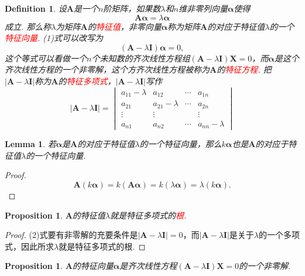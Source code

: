 \documentclass{article}
\newtheorem{lemma}[theorem]{Lemma}
\newtheorem{proposition}[theorem]{Proposition}
\newtheorem{definition}[theorem]{Definition}
\newcommand{\mbf}[1]{\bm{#1}}
\newcommand{\redt}[1]{\textcolor{red}{#1}}
\begin{document}
\begin{definition}
\rm 设$\mbf{A}$是一个$n$阶矩阵，如果数$\lambda$和$n$维非零列向量$\mbf{\alpha}$使得
\begin{equation}
\mbf{A}\mbf{\alpha} = \lambda\mbf{\alpha}
\end{equation}
成立. 那么称$\lambda$为矩阵$\mbf{A}$的\redt{特征值}，非零向量$\mbf{\alpha}$称为矩阵$\mbf{A}$的对应于特征值$\lambda$的一个\redt{特征向量}. (1)式可以改写为
\begin{equation}
(\mbf{A}-\lambda\mbf{I})\mbf{\alpha} = 0,
\end{equation}
这个等式可以看做一个$n$个未知数的齐次线性方程组$(\mbf{A}-\lambda\mbf{I})\mbf{X} = 0$，而$\mbf{\alpha}$是这个齐次线性方程的一个非零解，这个方齐次线性方程被称为$\mbf{A}$的\redt{特征方程}. 把$|\mbf{A}-\lambda\mbf{I}|$称为$\mbf{A}$的\redt{特征多项式}，$|\mbf{A}-\lambda\mbf{I}|$写作
$$
|\mbf{A}-\lambda\mbf{I}| = 
\begin{vmatrix}
a_{11} - \lambda & a_{12} & \cdots & a_{1n} \\
a_{21} & a_{21} - \lambda & \cdots & a_{2n} \\
\vdots & \vdots && \vdots \\
a_{n1} & a_{n2} & \cdots & a_{nn}-\lambda 
\end{vmatrix}
$$
\end{definition}

\begin{lemma}
\rm 若$\mbf{\alpha}$是$\mbf{A}$的对应于特征值$\lambda$的一个特征向量，那么$k\mbf{\alpha}$也是$\mbf{A}$的对应于特征值$\lambda$的一个特征向量. 
\end{lemma}

\begin{proof}
$$
\mbf{A}(k\mbf{\alpha}) = k(\mbf{A}\mbf{\alpha}) = k(\lambda\mbf{\alpha}) = \lambda(k\mbf{\alpha}).
$$
\end{proof}


\begin{proposition}
\rm $\mbf{A}$的特征值$\lambda$就是特征多项式的\redt{根}.
\end{proposition}

\begin{proof}
\rm (2)式要有非零解的充要条件是$|\mbf{A}-\lambda\mbf{I}| = 0$，而$|\mbf{A}-\lambda\mbf{I}|$是关于$\lambda$的一个多项式，因此所求$\lambda$就是特征多项式的根.
\end{proof}

\begin{proposition}
\rm $\mbf{A}$的特征向量$\mbf{\alpha}$是齐次线性方程$(\mbf{A}-\lambda\mbf{I})\mbf{X} = 0$的一个非零解.
\end{proposition}
\end{document}

